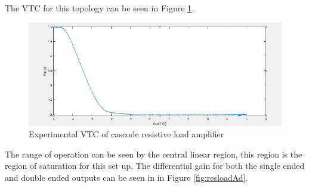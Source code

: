 The VTC for this topology can be seen in Figure \ref{fig:resloVTC}.
\begin{figure}[H]
    \begin{center}
    \includegraphics[scale=.45]{ExperimentalImplementation/VTC_res_cascode.png}
    \caption{Experimental VTC of cascode resistive load amplifier}
    \label{fig:resloVTC}
    \end{center}
\end{figure}
The range of operation can be seen by the central linear region, this region is the region of saturation for this set up. The differential gain for both the single ended and double ended outputs can be seen in in Figure \ref{fig:resloadAd}.


